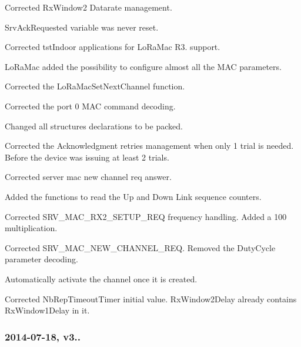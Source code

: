 \begin{DoxyItemize}
\begin{DoxyEnumerate}
\item Corrected Rx\+Window2 Datarate management.
\item Srv\+Ack\+Requested variable was never reset.
\item Corrected tst\+Indoor applications for Lo\+Ra\+Mac R3. support.
\item Lo\+Ra\+Mac added the possibility to configure almost all the M\+AC parameters.
\item Corrected the Lo\+Ra\+Mac\+Set\+Next\+Channel function.
\item Corrected the port 0 M\+AC command decoding.
\item Changed all structures declarations to be packed.
\item Corrected the Acknowledgment retries management when only 1 trial is needed. Before the device was issuing at least 2 trials.
\item Corrected server mac new channel req answer.
\item Added the functions to read the Up and Down Link sequence counters.
\item Corrected S\+R\+V\+\_\+\+M\+A\+C\+\_\+\+R\+X2\+\_\+\+S\+E\+T\+U\+P\+\_\+\+R\+EQ frequency handling. Added a 100 multiplication.
\item Corrected S\+R\+V\+\_\+\+M\+A\+C\+\_\+\+N\+E\+W\+\_\+\+C\+H\+A\+N\+N\+E\+L\+\_\+\+R\+EQ. Removed the Duty\+Cycle parameter decoding.
\item Automatically activate the channel once it is created.
\item Corrected Nb\+Rep\+Timeout\+Timer initial value. Rx\+Window2\+Delay already contains Rx\+Window1\+Delay in it.
\end{DoxyEnumerate}
\end{DoxyItemize}

\subsubsection*{2014-\/07-\/18, v3..}


